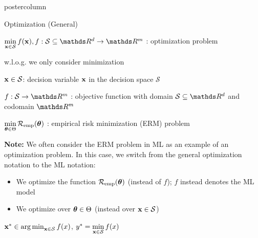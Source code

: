 \documentclass[11pt,compress,t,notes=noshow, xcolor=table]{beamer}
\newlength{\columnheight} %
\begin{document}
\begin{frame}[fragile]{}
\begin{columns}
	\begin{column}{.31\textwidth}
		\begin{beamercolorbox}[center]{postercolumn}
			\begin{minipage}{.98\textwidth}
				\parbox[t][\columnheight]{\textwidth}{
					\vspace*{0.75cm}
					\begin{myblock}{Optimization (General)}
						\begin{codebox}
							$\min\limits_{\xv \in \mathcal{S}} f(\xv), f: \mathcal{S}\subseteq \R^d \to \R^m$ :
							 optimization problem
						\end{codebox}
						\hspace*{1ex} w.l.o.g. we only consider minimization \\
						\begin{codebox}
							$\mathbf{x} \in \mathcal{S}$: decision variable $\mathbf{x}$ in the decision space $\mathcal{S}$
						\end{codebox}
						\hspace*{1ex}
						\begin{codebox}
							 $f: \mathcal{S} \to \R^m$ : objective function with domain $\mathcal{S} \subseteq \R^d$ and codomain $\R^m$
						\end{codebox}
						\hspace*{1ex} 
						\begin{codebox}
							$\min\limits_{\bm{\theta} \in \Theta} \mathcal{R}_{\text{emp}}(\bm{\theta})$ : empirical risk minimization (ERM) problem
						\end{codebox}
						\hspace*{1ex} \textbf{Note:} We often consider the ERM problem in ML as an example of an optimization problem. In this case, we switch from the general optimization notation to the ML notation: 
						\begin{itemize}
							\item We optimize the function $\mathcal{R}_{\text{emp}}(\bm{\theta})$ (instead of $f$); $f$ instead denotes the ML model
							\item We optimize over $\bm{\theta} \in \Theta$ (instead over $\mathbf{x} \in \mathcal{S}$) 
						\end{itemize}
						\hspace*{1ex}			
						\begin{codebox}
							 $\mathbf{x}^\ast \in \operatorname{arg\,min}\limits_{\mathbf{x} \in \mathcal{S}} f(x)$, $y^\ast = \min\limits_{\mathbf{x} \in \mathcal{S}} f(x)$

\end{codebox}
\end{myblock}}
\end{minipage}
\end{beamercolorbox}
\end{column}
\end{columns}
\end{frame}
\end{document}
